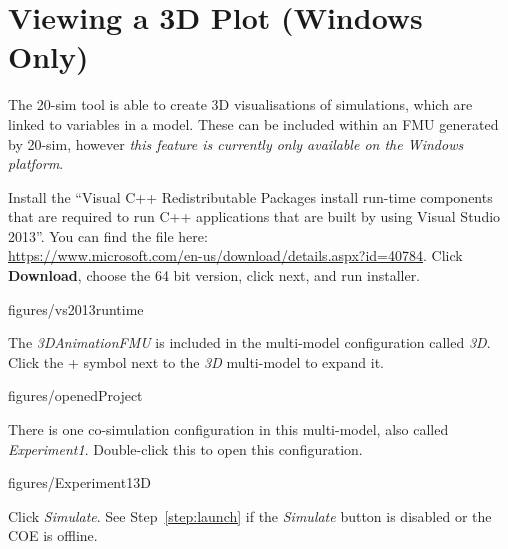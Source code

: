 \documentclass[11pt,a4paper]{../tutorial}
\begin{document}
\section{Viewing a 3D Plot (Windows Only)}

The 20-sim tool is able to create 3D visualisations of simulations, which are linked to variables in a model. These can be included within an FMU generated by 20-sim, however \emph{this feature is currently only available on the Windows platform}.

\begin{instructions}
\item Install the ``Visual C++ Redistributable Packages install run-time components that are required to run C++ applications that are built by using Visual Studio 2013''. You can find the file here: \\ \url{https://www.microsoft.com/en-us/download/details.aspx?id=40784}. Click \textbf{Download}, choose the 64 bit version, click next, and run installer.

    \begin{annotation}[width=0.84\linewidth]{figures/vs2013runtime}
    \end{annotation}



\item The \emph{3DAnimationFMU} is included in the multi-model configuration called \emph{3D}. Click the + symbol next to the \emph{3D} multi-model to expand it.

    \begin{annotation}[width=0.53\linewidth,trim=0 0 250 200,clip]{figures/openedProject}
    \end{annotation}

\item There is one co-simulation configuration in this multi-model, also called \emph{Experiment1}. Double-click this to open this configuration.

    \begin{annotation}[width=0.53\linewidth,trim=0 0 250 200,clip]{figures/Experiment13D}
    \end{annotation}

\newpage
\item Click \emph{Simulate}. See Step~\ref{step:launch} if the \emph{Simulate} button is disabled or the COE is offline.


\end{instructions}
\end{document}
